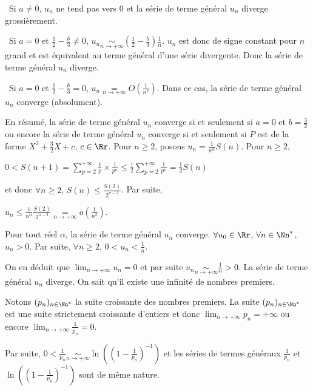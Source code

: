 {{\textbullet~Si $a\neq0$, $u_n$ ne tend pas vers $0$ et la série de terme général $u_n$ diverge grossièrement.

\textbullet~Si $a=0$ et $\frac{1}{2}-\frac{b}{3}\neq0$, $u_n\underset{n\rightarrow+\infty}{\sim}\left(\frac{1}{2}-\frac{b}{3}\right)\frac{1}{n}$. $u_n$ est donc de signe constant pour $n$ grand et est équivalent au terme général d'une série divergente. Donc la série de terme général $u_n$ diverge.

\textbullet~Si $a = 0$ et $\frac{1}{2}-\frac{b}{3}= 0$, $u_n\underset{n\rightarrow+\infty}{=}O\left(\frac{1}{n^2}\right)$. Dans ce cas, la série de terme général $u_n$ converge (absolument).

En résumé, la série de terme général $u_n$ converge si et seulement si $a = 0$ et  $b=\frac{3}{2}$ ou encore la série de terme général $u_n$ converge si et seulement si $P$ est de la forme $X^3+\frac{3}{2}X+c$, $c\in\Rr$.
Pour $n\geqslant2$, posons $u_n=\frac{1}{n^\alpha}S(n)$. Pour $n\geqslant2$,

\begin{center}
$0<S(n+1)=\sum_{p=2}^{+\infty}\frac{1}{p}\times\frac{1}{p^n}\leqslant\frac{1}{2}\sum_{p=2}^{+\infty}\frac{1}{p^n}=\frac{1}{2}S(n)$
\end{center}

et donc $\forall n\geqslant2$, $S(n)\leqslant\frac{S(2)}{2^{n-2}}$. Par suite,

\begin{center}
$u_n\leqslant\frac{1}{n^\alpha}\frac{S(2)}{2^{n-2}}\underset{n\rightarrow+\infty}{=}o\left(\frac{1}{n^2}\right)$.
\end{center}

Pour tout réel $\alpha$, la série de terme général $u_n$ converge.
$\forall u_0\in\Rr$, $\forall n\in\Nn^*$, $u_n > 0$. Par suite, $\forall n\geqslant 2$, $0< u_n<\frac{1}{n}$.

On en déduit que $\lim_{n \rightarrow +\infty}u_n=0$ et par suite $u_n\underset{n\rightarrow+\infty}{\sim}\frac{1}{n}>0$. La série de terme général $u_n$ diverge.
On sait qu'il existe une infinité de nombres premiers.

Notons $(p_n)_{n\in\Nn^*}$ la suite croissante des nombres premiers. La suite $(p_n)_{n\in\Nn^*}$ est une suite strictement croissante d'entiers et donc $\lim_{n \rightarrow +\infty}p_n= +\infty$ ou encore $\lim_{n \rightarrow +\infty}\frac{1}{p_n}=0$.

Par suite, $0<\frac{1}{p_n}\underset{n\rightarrow+\infty}{\sim}\ln\left(\left(1-\frac{1}{p_n}\right)^{-1}\right)$ et les séries de termes généraux $\frac{1}{p_n}$ et $\ln\left(\left(1-\frac{1}{p_n}\right)^{-1}\right)$ sont de même nature.

}}
